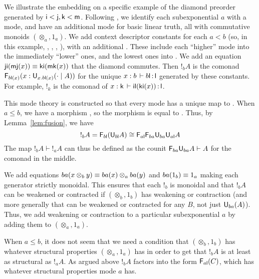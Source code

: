 We illustrate the embedding on a specific example of the diamond
preorder generated by $\mathsf{i} < \mathsf{j},\mathsf{k} < \mathsf{m}$.  Following
\citep[Example 4.3]{reed09adjoint}, we identify each subexponential $a$
with a mode, and have an additional mode  for basic linear truth,
all with commutative monoids $(\otimes_a,1_a)$.  We add context
descriptor constants  for each $a < b$ (so, in
this example, , , , ), with an
additional .  These include each
``higher'' mode into the immediately ``lower'' ones, and the lowest ones
into .  We add an equation $\mathsf{ji}(\mathsf{mj}(x)) \equiv
\mathsf{ki}(\mathsf{mk}(x))$ that the diamond commutes.  Then $!_b A$ is the
comonad $\mathsf{F}_{b{\mathsf{l}}(x)}(x : \mathsf{U}_{x.b\mathsf{l}(x)}(\cdot \mid A))$ for the
unique $x : b \, \vdash b{\mathsf{l}} \, \mathit{:} \, \mathsf{l}$ generated by these constants.
For example, $!_k$ is the comonad of $x :
  \mathsf{k} \, \vdash \mathsf{il}(\mathsf{ki}(x)) \, \mathit{:} \, \mathsf{l}$.

This mode theory is constructed so that every mode has a unique map to
.  When $a \le b$, we have a morphism , so
the morphism  is equal to
.  Thus, by Lemma~\ref{lem:fusion},
we have
\[
!_b A = \mathsf{F}_{{b\mathsf{l}}}(\mathsf{U}_{{b\mathsf{l}}} A) \cong \mathsf{F}_{{a\mathsf{l}}}\mathsf{F}_{{ba}} \mathsf{U}_{{ba}} \mathsf{U}_{{a\mathsf{l}}} A
\]
The map $!_b A \vdash !_a A$ can thus be defined as the counit
$\mathsf{F}_{{ba}} \mathsf{U}_{{ba}} A \vdash A$ for the comonad in the middle.

We add equations $ba(x \otimes_b y) \equiv ba(x) \otimes_a ba(y)$ and
$ba(1_b) \equiv 1_a$ making each generator strictly monoidal.  This
ensures that each $!_b$ is monoidal and that $!_b A$ can be weakened or
contracted if $(\otimes_b,1_b)$ has weakening or contraction (and more
generally that  can be weakened or contracted for any $B$, not
just $\mathsf{U}_{ba}{(A)}$).  Thus, we add weakening or contraction to
a particular subexponential $a$ by adding them to $(\otimes_a,1_a)$.

When $a \le b$, it does not seem that we need a condition that
$(\otimes_b,1_b)$ has whatever structural properties $(\otimes_a,1_a)$
has in order to get that $!_b A$ is at least as structural as $!_a A$.
As argued above $!_b A$ factors into the form $\mathsf{F}_{a{\mathsf{l}}}(C)$,
which has whatever structural properties mode $a$ has.

